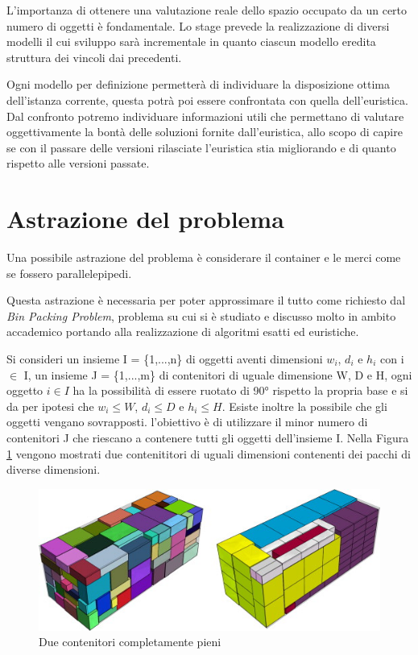 L'importanza di ottenere una valutazione reale dello spazio occupato da un certo numero di oggetti è fondamentale. Lo stage prevede la realizzazione di diversi modelli il cui sviluppo sarà incrementale in quanto ciascun modello eredita struttura dei vincoli dai precedenti.

Ogni modello per definizione permetterà di individuare la disposizione ottima dell'istanza corrente, questa potrà poi essere confrontata con quella dell'euristica. Dal confronto potremo individuare informazioni utili che permettano di valutare oggettivamente la bontà delle soluzioni fornite dall'euristica, allo scopo di capire se con il passare delle versioni rilasciate l'euristica stia migliorando e di quanto rispetto alle versioni passate.

\section{Astrazione del problema}
Una possibile astrazione del problema è considerare il container e le merci come se fossero parallelepipedi.

Questa astrazione è necessaria per poter approssimare il tutto come richiesto dal \textit{Bin Packing Problem}, problema su cui si è studiato e discusso molto in ambito accademico portando alla realizzazione di algoritmi esatti ed euristiche.

Si consideri un insieme I = \{1,...,n\} di oggetti aventi dimensioni $w_{i}$, $d_{i}$ e $h_{i}$ con i $\in$ I, un insieme J = \{1,...,m\} di contenitori di uguale dimensione W, D e H, ogni oggetto $i \in I$ ha la possibilità di essere ruotato di 90° rispetto la propria base e si da per ipotesi che $w_{i} \leq W$, $d_{i} \leq D$ e $h_{i} \leq H$. Esiste inoltre la possibile che gli oggetti vengano sovrapposti. l'obiettivo è di utilizzare il minor numero di contenitori J che riescano a contenere tutti gli oggetti dell'insieme I. Nella Figura \ref{bin_packing_figures} vengono mostrati due contenititori di uguali dimensioni contenenti dei pacchi di diverse dimensioni.
\begin{figure}[H]
	\begin{center} \includegraphics[scale=0.8]{figures/bin_packing}
		\caption[Contenitori Bin Packing]{Due contenitori completamente pieni}  
		\label{bin_packing_figures}
	\end{center}
\end{figure}

